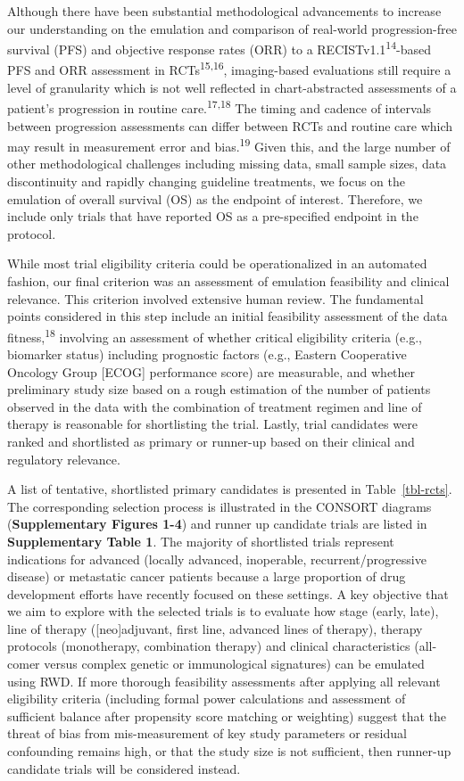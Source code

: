 \documentclass[
  letterpaper,
  DIV=11,
  numbers=noendperiod]{scrartcl}
\begin{document}
Although there have been substantial methodological advancements to
increase our understanding on the emulation and comparison of real-world
progression-free survival (PFS) and objective response rates (ORR) to a
RECISTv1.1\textsuperscript{14}-based PFS and ORR assessment in
RCTs\textsuperscript{15,16}, imaging-based evaluations still require a
level of granularity which is not well reflected in chart-abstracted
assessments of a patient's progression in routine
care.\textsuperscript{17,18} The timing and cadence of intervals between
progression assessments can differ between RCTs and routine care which
may result in measurement error and bias.\textsuperscript{19} Given
this, and the large number of other methodological challenges including
missing data, small sample sizes, data discontinuity and rapidly
changing guideline treatments, we focus on the emulation of overall
survival (OS) as the endpoint of interest. Therefore, we include only
trials that have reported OS as a pre-specified endpoint in the
protocol.

While most trial eligibility criteria could be operationalized in an
automated fashion, our final criterion was an assessment of emulation
feasibility and clinical relevance. This criterion involved extensive
human review. The fundamental points considered in this step include an
initial feasibility assessment of the data fitness,\textsuperscript{18}
involving an assessment of whether critical eligibility criteria (e.g.,
biomarker status) including prognostic factors (e.g., Eastern
Cooperative Oncology Group {[}ECOG{]} performance score) are measurable,
and whether preliminary study size based on a rough estimation of the
number of patients observed in the data with the combination of
treatment regimen and line of therapy is reasonable for shortlisting the
trial. Lastly, trial candidates were ranked and shortlisted as primary
or runner-up based on their clinical and regulatory relevance.

A list of tentative, shortlisted primary candidates is presented in
Table~\ref{tbl-rcts}. The corresponding selection process is illustrated
in the CONSORT diagrams (\textbf{Supplementary Figures 1-4}) and runner
up candidate trials are listed in \textbf{Supplementary Table 1}. The
majority of shortlisted trials represent indications for advanced
(locally advanced, inoperable, recurrent/progressive disease) or
metastatic cancer patients because a large proportion of drug
development efforts have recently focused on these settings. A key
objective that we aim to explore with the selected trials is to evaluate
how stage (early, late), line of therapy ({[}neo{]}adjuvant, first line,
advanced lines of therapy), therapy protocols (monotherapy, combination
therapy) and clinical characteristics (all-comer versus complex genetic
or immunological signatures) can be emulated using RWD. If more thorough
feasibility assessments after applying all relevant eligibility criteria
(including formal power calculations and assessment of sufficient
balance after propensity score matching or weighting) suggest that the
threat of bias from mis-measurement of key study parameters or residual
confounding remains high, or that the study size is not sufficient, then
runner-up candidate trials will be considered instead.
\end{document}

